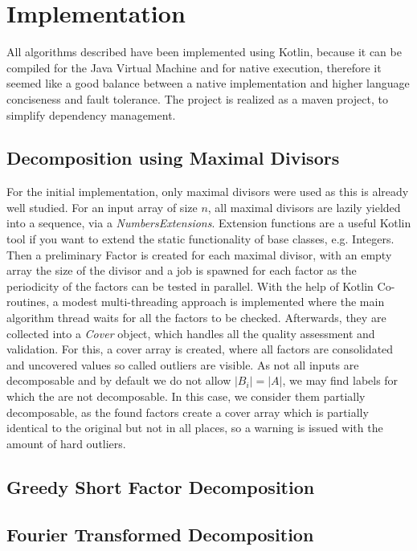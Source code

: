 \chapter{Implementation}
\label{ch:Implementation}
All algorithms described have been implemented using Kotlin, because it can be compiled for the Java Virtual Machine and for native execution, therefore it seemed like a good balance between a native implementation and higher language conciseness and fault tolerance. The project is realized as a maven project, to simplify dependency management.

\section{Decomposition using Maximal Divisors}
For the initial implementation, only maximal divisors were used as this is already well studied. For an input array of size $n$, all maximal divisors are lazily yielded into a sequence, via a \textit{NumbersExtensions}. Extension functions are a useful Kotlin tool if you want to extend the static functionality of base classes, e.g. Integers. Then a preliminary Factor is created for each maximal divisor, with an empty array the size of the divisor and a job is spawned for each factor as the periodicity of the factors can be tested in parallel. With the help of Kotlin Co-routines, a modest multi-threading approach is implemented where the main algorithm thread waits for all the factors to be checked. Afterwards, they are collected into a \textit{Cover} object, which handles all the quality assessment and validation. For this, a cover array is created, where all factors are consolidated and uncovered values so called outliers are visible. As not all inputs are decomposable and by default we do not allow  $|B_i| = |A|$, we may find labels for which the \DFAs are not decomposable. In this case, we consider them partially decomposable, as the found factors create a cover array which is partially identical to the original but not in all places, so a warning is issued with the amount of hard outliers.


\section{Greedy Short Factor Decomposition}

\section{Fourier Transformed Decomposition}

